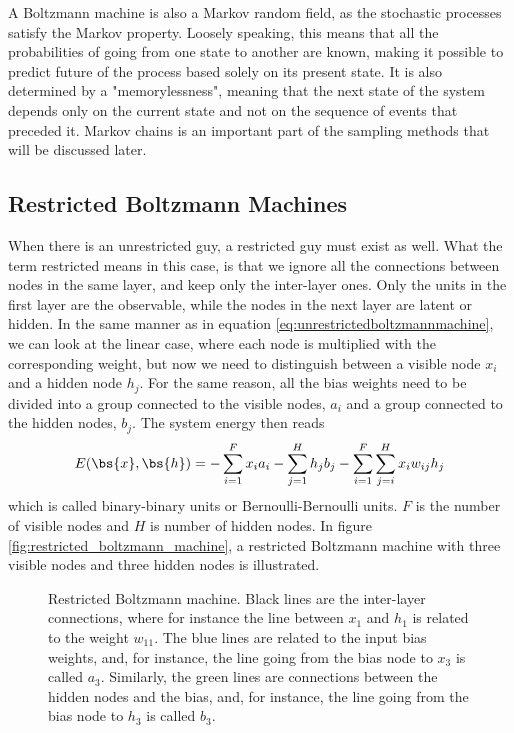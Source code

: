 A Boltzmann machine is also a Markov random field, as the stochastic processes satisfy the Markov property. Loosely speaking, this means that all the probabilities of going from one state to another are known, making it possible to predict future of the process based solely on its present state. It is also determined by a "memorylessness", meaning that the next state of the system depends only on the current state and not on the sequence of events that preceded it. \cite{fischer_training_2014} Markov chains is an important part of the sampling methods that will be discussed later. 

\subsection{Restricted Boltzmann Machines} \label{sec:RBM}
When there is an unrestricted guy, a restricted guy must exist as well. What the term restricted means in this case, is that we ignore all the connections between nodes in the same layer, and keep only the inter-layer ones. Only the units in the first layer are the observable, while the nodes in the next layer are latent or hidden. In the same manner as in equation \eqref{eq:unrestrictedboltzmannmachine}, we can look at the linear case, where each node is multiplied with the corresponding weight, but now we need to distinguish between a visible node $x_i$ and a hidden node $h_j$. For the same reason, all the bias weights need to be divided into a group connected to the visible nodes, $a_i$ and a group connected to the hidden nodes, $b_j$. The system energy then reads
\begin{equation}
E(\bs{x},\bs{h})=- \sum_{i=1}^Fx_ia_i- \sum_{j=1}^Hh_jb_j-\sum_{i=1}^F\sum_{j=i}^H x_iw_{ij}h_j 
\label{eq:binarybinary}
\end{equation}
which is called binary-binary units or Bernoulli-Bernoulli units. $F$ is the number of visible nodes and $H$ is number of hidden nodes. In figure \eqref{fig:restricted_boltzmann_machine}, a restricted Boltzmann machine with three visible nodes and three hidden nodes is illustrated.

\begin{figure}
	\centering
	
	\caption{Restricted Boltzmann machine. Black lines are the inter-layer connections, where for instance the line between $x_1$ and $h_1$ is related to the weight $w_{11}$. The blue lines are related to the input bias weights, and, for instance, the line going from the bias node to $x_3$ is called $a_3$. Similarly, the green lines are connections between the hidden nodes and the bias, and, for instance, the line going from the bias node to $h_3$ is called $b_3$.}
	\label{fig:restricted_boltzmann_machine}
\end{figure}

